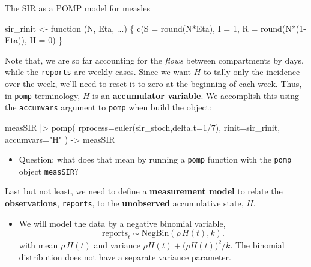 \documentclass[
  ignorenonframetext,
  aspectratio=169,
  t]{beamer}
\newenvironment{Shaded}{\begin{snugshade}}{\end{snugshade}}
\newcommand{\AttributeTok}[1]{\textcolor[rgb]{0.40,0.45,0.13}{#1}}
\newcommand{\ControlFlowTok}[1]{\textcolor[rgb]{0.00,0.23,0.31}{#1}}
\newcommand{\DecValTok}[1]{\textcolor[rgb]{0.68,0.00,0.00}{#1}}
\newcommand{\FunctionTok}[1]{\textcolor[rgb]{0.28,0.35,0.67}{#1}}
\newcommand{\NormalTok}[1]{\textcolor[rgb]{0.00,0.23,0.31}{#1}}
\newcommand{\OtherTok}[1]{\textcolor[rgb]{0.00,0.23,0.31}{#1}}
\newcommand{\SpecialCharTok}[1]{\textcolor[rgb]{0.37,0.37,0.37}{#1}}
\newcommand{\StringTok}[1]{\textcolor[rgb]{0.13,0.47,0.30}{#1}}
\providecommand{\tightlist}{%
  \setlength{\itemsep}{0pt}\setlength{\parskip}{0pt}}\usepackage{longtable,booktabs,array}
\theoremstyle{definition}
\newcommand\dist[2]{\mathrm{#1}\left(#2\right)}
\begin{document}
\begin{frame}{The SIR as a POMP model for
measles}
\begin{Shaded}
\begin{Highlighting}[]
\NormalTok{sir\_rinit }\OtherTok{\textless{}{-}} \ControlFlowTok{function}\NormalTok{ (N, Eta, ...) \{}
  \FunctionTok{c}\NormalTok{(}\AttributeTok{S =} \FunctionTok{round}\NormalTok{(N}\SpecialCharTok{*}\NormalTok{Eta), }\AttributeTok{I =} \DecValTok{1}\NormalTok{, }\AttributeTok{R =} \FunctionTok{round}\NormalTok{(N}\SpecialCharTok{*}\NormalTok{(}\DecValTok{1}\SpecialCharTok{{-}}\NormalTok{Eta)), }\AttributeTok{H =} \DecValTok{0}\NormalTok{)}
\NormalTok{\}}
\end{Highlighting}
\end{Shaded}

\framebreak

Note that, we are so far accounting for the \emph{flows} between
compartments by days, while the \texttt{reports} are weekly cases. Since
we want \(H\) to tally only the incidence over the week, we'll need to
reset it to zero at the beginning of each week. Thus, in \texttt{pomp}
terminology, \(H\) is an \textbf{accumulator variable}. We accomplish
this using the \texttt{accumvars} argument to \texttt{pomp} when build
the object:

\begin{Shaded}
\begin{Highlighting}[]
\NormalTok{measSIR }\SpecialCharTok{|\textgreater{}}
  \FunctionTok{pomp}\NormalTok{(}
    \AttributeTok{rprocess=}\FunctionTok{euler}\NormalTok{(sir\_stoch,}\AttributeTok{delta.t=}\DecValTok{1}\SpecialCharTok{/}\DecValTok{7}\NormalTok{),}
    \AttributeTok{rinit=}\NormalTok{sir\_rinit, }
    \AttributeTok{accumvars=}\StringTok{"H"}
\NormalTok{  ) }\OtherTok{{-}\textgreater{}}\NormalTok{ measSIR}
\end{Highlighting}
\end{Shaded}

\begin{itemize}
\tightlist
\item
  Question: what does that mean by running a \texttt{pomp} function with
  the \texttt{pomp} object \texttt{measSIR}?
\end{itemize}

\framebreak

Last but not least, we need to define a \textbf{measurement model} to
relate the \textbf{observations}, \texttt{reports}, to the
\textbf{unobserved} accumulative state, \(H\).

\begin{itemize}
\tightlist
\item
  We will model the data by a negative binomial variable,
  \[\mathrm{reports}_t \sim \dist{NegBin}{\rho\,H(t),k}.\] with mean
  \(\rho\,H(t)\) and variance \(\rho H(t)+ \big(\rho H(t)\big)^2/k\).
  The binomial distribution does not have a separate variance parameter.
\end{itemize}


\end{frame}
\end{document}

